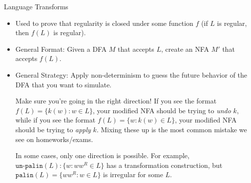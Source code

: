 \documentclass{beamer}
\begin{document}
\begin{frame}[t]{Language Transforms}
    \begin{itemize}
        \item Used to prove that regularity is closed under some function $f$ (if $L$ is regular, then $f(L)$ is regular).
        \item \alert{General Format:} Given a DFA $M$ that accepts $L$, create an NFA $M'$ that accepts $f(L)$.
        \item \pause \alert{General Strategy:} Apply non-determinism to guess the future behavior of the DFA that you want to simulate.\pause
        \vspace{1 cm}
        \begin{alertblock}{Make sure you're going in the right direction!}
            If you see the format $f(L) = \{k(w) : w \in L\}$, your modified NFA should be trying to \textit{undo} $k$, while if you see the format $f(L) = \{w : k(w) \in L\}$, your modified NFA should be trying to \textit{apply} $k$. Mixing these up is the most common mistake we see on homeworks/exams.

            \vspace{.25cm}
            
            In some cases, only one direction is possible. For example, $\texttt{un-palin}(L): \{w : ww^R \in L\}$ has a transformation construction, but $\texttt{palin}(L) = \{ww^R: w \in L\}$ is irregular for some $L$.
        \end{alertblock}
    \end{itemize}
\end{frame}
\end{document}
